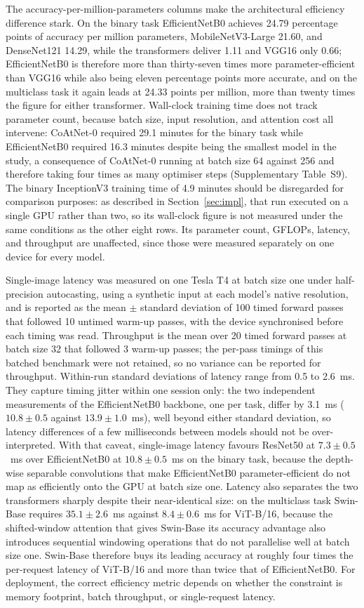 \documentclass[final,3p,times,number]{elsarticle}
\begin{document}
The accuracy-per-million-parameters columns make the architectural efficiency difference stark. On the binary task EfficientNetB0 achieves 24.79 percentage points of accuracy per million parameters, MobileNetV3-Large 21.60, and DenseNet121 14.29, while the transformers deliver 1.11 and VGG16 only 0.66; EfficientNetB0 is therefore more than thirty-seven times more parameter-efficient than VGG16 while also being eleven percentage points more accurate, and on the multiclass task it again leads at 24.33 points per million, more than twenty times the figure for either transformer. Wall-clock training time does not track parameter count, because batch size, input resolution, and attention cost all intervene: CoAtNet-0 required 29.1 minutes for the binary task while EfficientNetB0 required 16.3 minutes despite being the smallest model in the study, a consequence of CoAtNet-0 running at batch size 64 against 256 and therefore taking four times as many optimiser steps (Supplementary Table~S9). The binary InceptionV3 training time of 4.9 minutes should be disregarded for comparison purposes: as described in Section~\ref{sec:impl}, that run executed on a single GPU rather than two, so its wall-clock figure is not measured under the same conditions as the other eight rows. Its parameter count, GFLOPs, latency, and throughput are unaffected, since those were measured separately on one device for every model.

Single-image latency was measured on one Tesla T4 at batch size one under half-precision autocasting, using a synthetic input at each model's native resolution, and is reported as the mean $\pm$ standard deviation of 100 timed forward passes that followed 10 untimed warm-up passes, with the device synchronised before each timing was read. Throughput is the mean over 20 timed forward passes at batch size 32 that followed 3 warm-up passes; the per-pass timings of this batched benchmark were not retained, so no variance can be reported for throughput. Within-run standard deviations of latency range from 0.5 to 2.6~ms. They capture timing jitter within one session only: the two independent measurements of the EfficientNetB0 backbone, one per task, differ by 3.1~ms ($10.8\pm 0.5$ against $13.9\pm 1.0$~ms), well beyond either standard deviation, so latency differences of a few milliseconds between models should not be over-interpreted. With that caveat, single-image latency favours ResNet50 at $7.3\pm 0.5$~ms over EfficientNetB0 at $10.8\pm 0.5$~ms on the binary task, because the depth-wise separable convolutions that make EfficientNetB0 parameter-efficient do not map as efficiently onto the GPU at batch size one. Latency also separates the two transformers sharply despite their near-identical size: on the multiclass task Swin-Base requires $35.1\pm 2.6$~ms against $8.4\pm 0.6$~ms for ViT-B/16, because the shifted-window attention that gives Swin-Base its accuracy advantage also introduces sequential windowing operations that do not parallelise well at batch size one. Swin-Base therefore buys its leading accuracy at roughly four times the per-request latency of ViT-B/16 and more than twice that of EfficientNetB0. For deployment, the correct efficiency metric depends on whether the constraint is memory footprint, batch throughput, or single-request latency.
\end{document}
